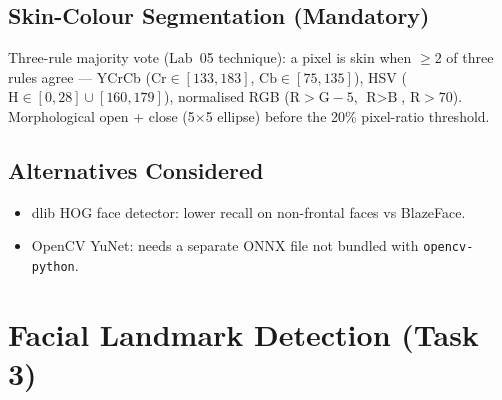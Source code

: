 \subsection{Skin-Colour Segmentation (Mandatory)}
Three-rule majority vote (Lab~05 technique): a pixel is skin when $\geq 2$ of
three rules agree --- YCrCb ($\text{Cr} \in [133, 183]$, $\text{Cb} \in [75, 135]$),
HSV ($\text{H} \in [0,28] \cup [160,179]$), normalised RGB
($\text{R} > \text{G}-5$, $\text{R} > \text{B}$, $\text{R} > 70$). Morphological
open + close (5$\times$5 ellipse) before the 20\% pixel-ratio threshold.

\subsection{Alternatives Considered}
\begin{itemize}
  \item dlib HOG face detector: lower recall on non-frontal faces vs BlazeFace.
  \item OpenCV YuNet: needs a separate ONNX file not bundled with \texttt{opencv-python}.
\end{itemize}

\section{Facial Landmark Detection (Task 3)}

